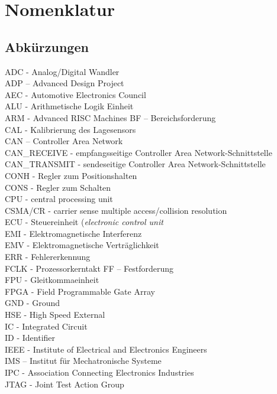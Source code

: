 \chapter*{Nomenklatur}
\section*{Abkürzungen}
ADC - Analog/Digital Wandler\\
ADP – Advanced Design Project\\
AEC - Automotive Electronics Council\\
ALU - Arithmetische Logik Einheit\\
ARM - Advanced RISC Machines
BF – Bereichsforderung\\
CAL - Kalibrierung des Lagesensors\\
CAN – Controller Area Network\\
CAN_RECEIVE - empfangsseitige Controller Area Network-Schnittstelle\\
CAN_TRANSMIT - sendeseitige Controller Area Network-Schnittstelle\\
CONH - Regler zum Positionshalten\\
CONS - Regler zum Schalten\\
CPU - central processing unit\\
CSMA/CR - carrier sense multiple access/collision resolution\\
ECU - Steuereinheit (\textit{electronic control unit}\\
EMI - Elektromagnetische Interferenz\\
EMV - Elektromagnetische Verträglichkeit\\
ERR - Fehlererkennung\\
FCLK - Prozessorkerntakt
FF – Festforderung\\
FPU - Gleitkommaeinheit\\
FPGA - Field Programmable Gate Array\\
GND - Ground\\
HSE - High Speed External\\
IC - Integrated Circuit\\
ID - Identifier\\
IEEE - Institute of Electrical and Electronics Engineers\\
IMS – Institut für Mechatronische Systeme\\
IPC - Association Connecting Electronics Industries\\
JTAG - Joint Test Action Group\\
